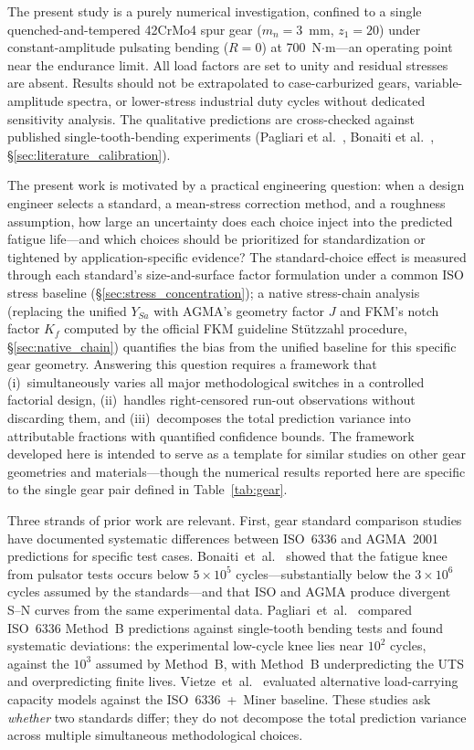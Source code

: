 \documentclass[twocolumn,12pt,a4paper]{article}
\begin{document}
The present study is a purely numerical investigation, confined to a
single quenched-and-tempered 42CrMo4 spur gear ($m_n=3$~mm,
$z_1=20$) under constant-amplitude pulsating bending ($R=0$) at
700~N$\cdot$m---an operating point near the endurance limit. All
load factors are set to unity and residual stresses are absent.
Results should not be extrapolated to case-carburized gears,
variable-amplitude spectra, or lower-stress industrial duty cycles
without dedicated sensitivity analysis. The qualitative predictions
are cross-checked against published single-tooth-bending experiments
(Pagliari et al.~\cite{pagliari2025}, Bonaiti et al.~\cite{bonaiti2024},
\S\ref{sec:literature_calibration}).

The present work is motivated by a practical engineering question:
when a design engineer selects a standard, a mean-stress correction
method, and a roughness assumption, how large an uncertainty does each
choice inject into the predicted fatigue life---and which choices
should be prioritized for standardization or tightened by
application-specific evidence? The standard-choice effect is measured
through each standard's size-and-surface factor formulation under a
common ISO stress baseline (\S\ref{sec:stress_concentration}); a
native stress-chain analysis (replacing the unified
$Y_{Sa}$ with AGMA's geometry factor $J$ and FKM's notch factor
$K_f$ computed by the official FKM guideline St\"utzzahl procedure,
\S\ref{sec:native_chain}) quantifies the bias from the unified
baseline for this specific gear
geometry. Answering this question
requires a framework that (i)~simultaneously varies all major
methodological switches in a controlled factorial design,
(ii)~handles right-censored
run-out observations without discarding them, and (iii)~decomposes the
total prediction variance into attributable fractions with quantified
confidence bounds. The framework developed here is intended to serve as
a template for similar studies on other gear geometries and
materials---though the numerical results reported here are specific
to the single gear pair defined in Table~\ref{tab:gear}.

Three strands of prior work are relevant. First, gear standard
comparison studies have documented systematic differences between
ISO~6336 and AGMA~2001 predictions for specific test cases.
Bonaiti~et~al.~\cite{bonaiti2024} showed that the fatigue knee from
pulsator tests occurs below $5\times10^5$ cycles---substantially
below the $3\times10^6$ cycles assumed by the
standards---and that ISO and AGMA produce divergent S--N curves from
the same experimental data. Pagliari~et~al.~\cite{pagliari2025}
compared ISO~6336 Method~B predictions against single-tooth bending
tests and found systematic deviations: the experimental low-cycle knee
lies near $10^2$ cycles, against the $10^3$ assumed by Method~B, with
Method~B underpredicting the UTS and overpredicting finite lives.
Vietze~et~al.~\cite{vietze2024}
evaluated alternative load-carrying capacity models against the
ISO~6336~+~Miner baseline. These studies ask \emph{whether} two
standards differ; they do not decompose the total prediction variance
across multiple simultaneous methodological choices.
\end{document}
